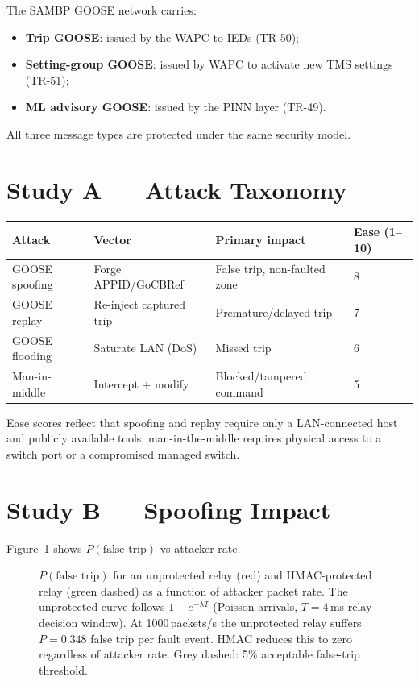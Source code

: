 \documentclass[11pt,a4paper]{article}
\begin{document}
The SAMBP GOOSE network carries:
\begin{itemize}
  \item \textbf{Trip GOOSE}: issued by the WAPC to IEDs (TR-50);
  \item \textbf{Setting-group GOOSE}: issued by WAPC to activate new
    TMS settings (TR-51);
  \item \textbf{ML advisory GOOSE}: issued by the PINN layer (TR-49).
\end{itemize}
All three message types are protected under the same security model.

\section{Study A --- Attack Taxonomy}
\label{sec:studyA}

\begin{center}
\begin{tabular}{@{}llll@{}}
\toprule
Attack & Vector & Primary impact & Ease (1--10) \\
\midrule
GOOSE spoofing & Forge APPID/GoCBRef & False trip, non-faulted zone & 8 \\
GOOSE replay & Re-inject captured trip & Premature/delayed trip & 7 \\
GOOSE flooding & Saturate LAN (DoS) & Missed trip & 6 \\
Man-in-middle & Intercept + modify & Blocked/tampered command & 5 \\
\bottomrule
\end{tabular}
\end{center}

\medskip\noindent
Ease scores reflect that spoofing and replay require only a LAN-connected
host and publicly available tools; man-in-the-middle requires physical
access to a switch port or a compromised managed switch.

\section{Study B --- Spoofing Impact}
\label{sec:studyB}

Figure~\ref{fig:spoofing} shows $P(\text{false trip})$ vs attacker rate.

\begin{figure}[htbp]
  \centering
  \resizebox{0.78\textwidth}{!}{}
  \caption{$P(\text{false trip})$ for an unprotected relay (red) and HMAC-protected
           relay (green dashed) as a function of attacker packet rate.  The
           unprotected curve follows $1-e^{-\lambda T}$ (Poisson arrivals,
           $T=4$\,ms relay decision window).  At 1000\,packets/s the
           unprotected relay suffers $P=0.348$ false trip per fault event.
           HMAC reduces this to zero regardless of attacker rate.  Grey dashed:
           5\% acceptable false-trip threshold.}
  \label{fig:spoofing}
\end{figure}
\end{document}

